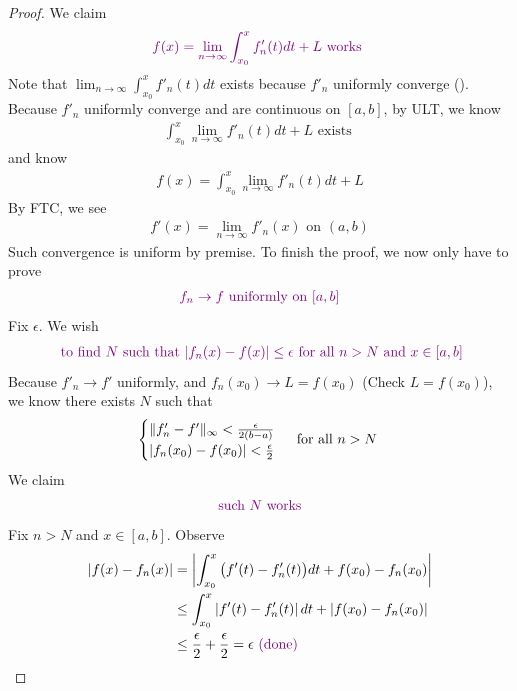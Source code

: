 \documentclass{report}
\begin{document}
\begin{proof}
We claim 
\begin{align*}
  \textcolor{violet}{f(x)=\lim_{n\to \infty}\int_{x_0}^x f'_n(t)dt+L\text{ works }} 
\end{align*}
Note that $\lim_{n\to \infty}\int_{x_0}^x f'_n(t)dt$ exists because $f'_n$ uniformly converge  ().\\

Because $f'_n$ uniformly converge and are continuous on $[a,b]$, by ULT, we know
 \begin{align*}
\int_{x_0}^x \lim_{n\to \infty}f'_n(t)dt+L\text{ exists }
\end{align*}
and know 
\begin{align*}
f(x)=\int_{x_0}^x \lim_{n\to \infty}f'_n(t)dt + L 
\end{align*}
By FTC, we see
 \begin{align*}
f'(x)=\lim_{n\to \infty}f'_n(x)\text{ on }(a,b)
\end{align*}
Such convergence is uniform by premise. To finish the proof, we now only have to prove 
\begin{align*}
\textcolor{violet}{f_n\to f\text{ uniformly on }[a,b]}
\end{align*}
Fix $\epsilon $. We wish 
\begin{align*}
\textcolor{violet}{\text{ to find $N$ such that  $\left|f_n(x)-f(x)\right|\leq \epsilon $ for all $n>N$ and  $x \in [a,b]$}}
\end{align*}
Because $f'_n \to f'$ uniformly, and $f_n(x_0) \to L=f(x_0)$ (Check $L=f(x_0)$), we know there exists $N$ such that 
 \begin{align*}
\begin{cases}
  \| f'_n-f' \|_\infty < \frac{\epsilon }{2(b-a)}\\
  \left|f_n(x_0)-f(x_0)\right|<\frac{\epsilon}{2}
\end{cases}\text{ for all $n>N$ }
\end{align*}
We claim 
\begin{align*}
\textcolor{violet}{\text{ such $N$ works }}
\end{align*}
Fix $n>N$ and  $x\in [a,b]$. Observe 
\begin{align*}
\left|f(x)-f_n(x)\right|&= \left|\int_{x_0}^x \big(f'(t)-f'_n(t) \big)dt+f(x_0)-f_n(x_0)\right|\\
&\leq \int_{x_0}^x \left|f'(t)-f'_n(t)\right|dt+ \left|f(x_0)-f_n(x_0)\right|\\
&\leq \frac{\epsilon}{2}+\frac{\epsilon}{2}=\epsilon \textcolor{violet}{\text{ (done) }}
\end{align*}
\end{proof}
\end{document}
